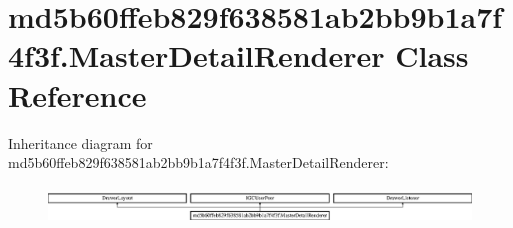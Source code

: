 \hypertarget{classmd5b60ffeb829f638581ab2bb9b1a7f4f3f_1_1MasterDetailRenderer}{}\section{md5b60ffeb829f638581ab2bb9b1a7f4f3f.\+Master\+Detail\+Renderer Class Reference}
\label{classmd5b60ffeb829f638581ab2bb9b1a7f4f3f_1_1MasterDetailRenderer}
Inheritance diagram for md5b60ffeb829f638581ab2bb9b1a7f4f3f.\+Master\+Detail\+Renderer\+:\begin{figure}[H]
\begin{center}
\leavevmode
\includegraphics[height=0.990274cm]{classmd5b60ffeb829f638581ab2bb9b1a7f4f3f_1_1MasterDetailRenderer}
\end{center}
\end{figure}
